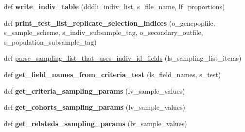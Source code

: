 \begin{DoxyCompactItemize}
\item 
def {\bfseries write\+\_\+indiv\+\_\+table} (dddli\+\_\+indiv\+\_\+list, s\+\_\+file\+\_\+name, lf\+\_\+proportions)\hypertarget{namespacenegui_1_1pgdriveneestimator_aafa226c9f86340bb646ac850410d315c}{}\label{namespacenegui_1_1pgdriveneestimator_aafa226c9f86340bb646ac850410d315c}

\item 
def {\bfseries print\+\_\+test\+\_\+list\+\_\+replicate\+\_\+selection\+\_\+indices} (o\+\_\+genepopfile, s\+\_\+sample\+\_\+scheme, s\+\_\+indiv\+\_\+subsample\+\_\+tag, o\+\_\+secondary\+\_\+outfile, s\+\_\+population\+\_\+subsample\+\_\+tag)\hypertarget{namespacenegui_1_1pgdriveneestimator_a97627c981f1e2e59eecd69efb11c7044}{}\label{namespacenegui_1_1pgdriveneestimator_a97627c981f1e2e59eecd69efb11c7044}

\item 
def \hyperlink{namespacenegui_1_1pgdriveneestimator_a367b16a89c7ae46ab0bda5b37e68d9af}{parse\+\_\+sampling\+\_\+list\+\_\+that\+\_\+uses\+\_\+indiv\+\_\+id\+\_\+fields} (ls\+\_\+sampling\+\_\+list\+\_\+items)
\item 
def {\bfseries get\+\_\+field\+\_\+names\+\_\+from\+\_\+criteria\+\_\+test} (ls\+\_\+field\+\_\+names, s\+\_\+test)\hypertarget{namespacenegui_1_1pgdriveneestimator_a37d1a0b6a3f2554bf105a44578083490}{}\label{namespacenegui_1_1pgdriveneestimator_a37d1a0b6a3f2554bf105a44578083490}

\item 
def {\bfseries get\+\_\+criteria\+\_\+sampling\+\_\+params} (lv\+\_\+sample\+\_\+values)\hypertarget{namespacenegui_1_1pgdriveneestimator_af360c7e217a3b975a58fcd93b11fcdd3}{}\label{namespacenegui_1_1pgdriveneestimator_af360c7e217a3b975a58fcd93b11fcdd3}

\item 
def {\bfseries get\+\_\+cohorts\+\_\+sampling\+\_\+params} (lv\+\_\+sample\+\_\+values)\hypertarget{namespacenegui_1_1pgdriveneestimator_a6539e2249f040ddf8ce8a80fc778ec85}{}\label{namespacenegui_1_1pgdriveneestimator_a6539e2249f040ddf8ce8a80fc778ec85}

\item 
def {\bfseries get\+\_\+relateds\+\_\+sampling\+\_\+params} (lv\+\_\+sample\+\_\+values)\hypertarget{namespacenegui_1_1pgdriveneestimator_af7a5417c7b36ee09c02ae3e0526f6999}{}\label{namespacenegui_1_1pgdriveneestimator_af7a5417c7b36ee09c02ae3e0526f6999}


\end{DoxyCompactItemize}
